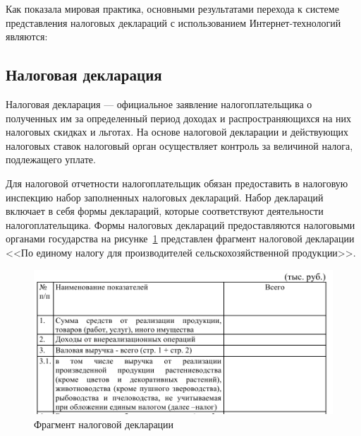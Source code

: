 \documentclass[14pt,a4paper]{reportmod}
\begin{document}
Как показала мировая практика, основными результатами перехода к системе представления налоговых деклараций с использованием Интернет-технологий являются:
\begin{gostitemize}
\end{gostitemize}

\subsection{Налоговая декларация}
Налоговая декларация — официальное заявление налогоплательщика о полученных им за определенный период доходах и распространяющихся на них налоговых скидках и льготах. На основе налоговой декларации и действующих налоговых ставок налоговый орган осуществляет контроль за величиной налога, подлежащего уплате\cite{refwikitaxreturn}.

Для налоговой отчетности налогоплательщик обязан предоставить в налоговую инспекцию набор заполненных налоговых деклараций. Набор деклараций включает в себя формы деклараций, которые соответствуют деятельности налогоплательщика. Формы налоговых деклараций предоставляются налоговыми органами государства на рисунке~\ref{pic:taxformrb} представлен фрагмент налоговой декларации <<По единому налогу для производителей сельскохозяйственной продукции>>.

\begin{figure}
  \centering
  \includegraphics[scale=0.5]{pics/taxformrb_chunk}
  \caption{Фрагмент налоговой декларации}
  \label{pic:taxformrb}
\end{figure}
\end{document}
